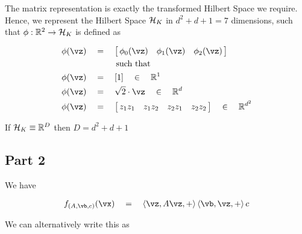 \documentclass{article}
\begin{document}
\begin{mlsolution}
\begin{addmargin}{1.5em}
		\clearpage

		The matrix representation is exactly the transformed Hilbert Space we require. Hence, we represent the Hilbert Space $\mathcal{H}_K$ in $d^2 + d + 1 = 7$ dimensions, such that $\phi:\mathbb{R}^2 \rightarrow \mathcal{H}_K$ is defined as

		\begin{align*}
			\phi(\vz)	&\eq	\brac{\,\begin{matrix}
					\phi_0(\vz)	&	\phi_1(\vz)	&	\phi_2(\vz)
			\end{matrix}\,} \\
			&\quad\quad\quad\,\,\mt{such that} \\
			\phi(\vz)	&\eq	\brac{1} \qin \R^1 \\
			\phi(\vz)	&\eq	\sqrt{2} \cdot \vz \qin \R^d \\
			\phi(\vz)	&\eq	\brac{\,\begin{matrix}
					z_1 z_1	&	z_1 z_2	&	z_2 z_1 &	z_2 z_2
			\end{matrix}\,} \qin \R^{d^2} \\
		\end{align*}

		If $\mathcal{H}_K \equiv \mathbb{R}^D$ then $D = d^2 + d + 1$

	\end{addmargin}

	\subsection*{Part 2}
	\begin{addmargin}{1.5em}

		We have

		\begin{align*}
			f_{(A, \vb, c)}(\vx)	\eq	\ip{\vz, A \vz}	 + \ip{\vb, \vz} + c
		\end{align*}

		We can alternatively write this as


\end{addmargin}
\end{mlsolution}
\end{document}
